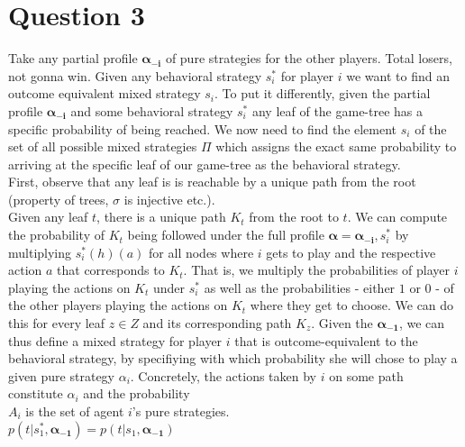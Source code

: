 \documentclass[10pt,a4paper]{article}
\begin{document}
\section*{Question 3}
Take any partial profile $\bm{\alpha_{-i}}$ of pure strategies for the other players. Total losers, not gonna win. Given any behavioral strategy $s_i^*$ for player $i$ we want to find an outcome equivalent mixed strategy $s_i$. To put it differently, given the partial profile $\bm{\alpha_{-i}}$ and some behavioral strategy $s_i^*$ any leaf of the game-tree has a specific probability of being reached. We now need to find the element $s_i$ of the set of all possible mixed strategies $\Pi$ which assigns the exact same probability to arriving at the specific leaf of our game-tree as the behavioral strategy.\\
First, observe that any leaf is is reachable by a unique path from the root (property of trees, $\sigma$ is injective etc.).\\
Given any leaf $t$, there is a unique path $K_t$ from the root to $t$. We can compute the probability of $K_t$ being followed under the full profile $\bm{\alpha}=\bm{\alpha_{-i}},s_i^*$ by multiplying $s_i^*(h)(a)$ for all nodes where $i$ gets to play and the respective action $a$ that corresponds to $K_t$. That is, we multiply the probabilities of player $i$ playing the actions on $K_t$ under $s_i^*$ as well as the probabilities - either $1$ or $0$ - of the other players playing the actions on $K_t$ where they get to choose. We can do this for every leaf $z\in Z$ and its corresponding path $K_z$. Given the $\bm{\alpha_{-1}}$, we can thus define a mixed strategy for player $i$ that is outcome-equivalent to the behavioral strategy, by specifiying with which probability she will chose to play a given pure strategy $\alpha_i$. Concretely, the actions taken by $i$ on some path constitute $\alpha_i$ and the probability \\

$A_i$ is the set of agent $i$'s pure strategies.\\
$p(t|s_1^*,\bm{\alpha_{-1}}) = p(t|s_1,\bm{\alpha_{-1}})$
\end{document}
